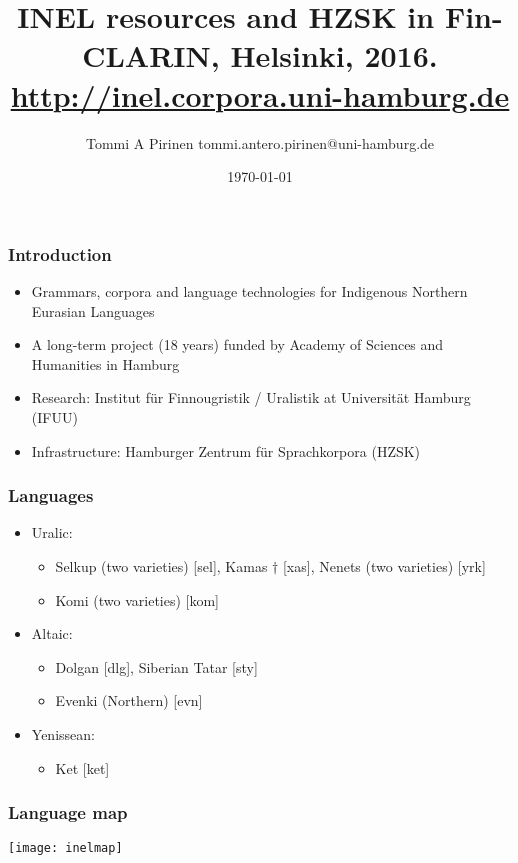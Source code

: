 \documentclass{beamer}
\title{INEL resources and HZSK
\scriptsize{in Fin-CLARIN, Helsinki, 2016.\\
\url{http://inel.corpora.uni-hamburg.de}}}
\author{Tommi A Pirinen \scriptsize \guilsinglleft
tommi.antero.pirinen@uni-hamburg.de \guilsinglright }
\institute{Universität Hamburg}
\date{\today}
\begin{document}

\maketitle

\begin{frame}
    \frametitle{Introduction}
    \begin{itemize}
        \item Grammars, corpora and language technologies for Indigenous
            Northern Eurasian Languages
        \item A long-term project (18 years) funded by Academy of Sciences and
            Humanities in Hamburg
        \item Research: Institut für Finnougristik / Uralistik at Universität
            Hamburg (IFUU)
        \item Infrastructure: Hamburger Zentrum für Sprachkorpora (HZSK)
    \end{itemize}
\end{frame}

\begin{frame}
    \frametitle{Languages}
    \begin{itemize}
        \item Uralic:
        \begin{itemize}
                \item Selkup (two varieties) [sel], Kamas $\dagger$ [xas],
                    Nenets (two varieties) [yrk]
                \item Komi (two varieties) [kom]
        \end{itemize}
        \item Altaic:
        \begin{itemize}
            \item Dolgan [dlg], Siberian Tatar [sty]
            \item Evenki (Northern) [evn]
        \end{itemize}
        \item Yenissean:
        \begin{itemize}
            \item Ket [ket]
        \end{itemize}
    \end{itemize}
\end{frame}

\begin{frame}
    \frametitle{Language map}
    \texttt{[image: inelmap]}
\end{frame}
\end{document}
